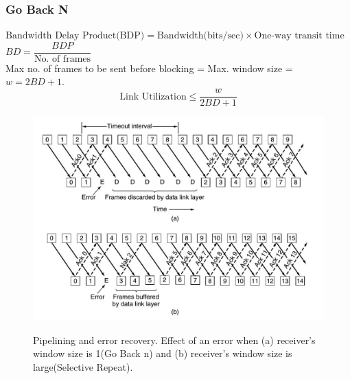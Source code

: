\documentclass[a4paper,oneside]{book}
\begin{document}
\subsubsection{Go Back N}
$\text{Bandwidth Delay Product(BDP)} = \text{Bandwidth(bits/sec)} \times \text{One-way transit time}$\\
$BD = \dfrac{BDP}{\text{No. of frames}}$\\
Max no. of frames to be sent before blocking = Max. window size = $w = 2BD + 1$.
$$ \text{Link Utilization} \le \dfrac{w}{2BD + 1}$$
\begin{figure}[H]
\caption{Pipelining and error recovery. Effect of an error when (a) receiver's window size is 1(Go Back n) and (b) receiver's window size is large(Selective Repeat).}
\includegraphics[scale=0.6]{Images/gobacknselectiverepeat}
\label{fig:cn_select_repeat}
\end{figure}
\end{document}

